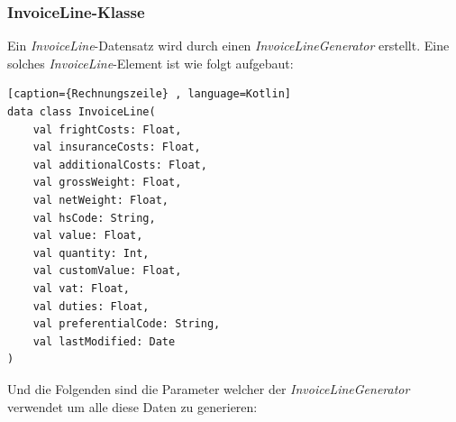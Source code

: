 \subsubsection{InvoiceLine-Klasse}
Ein \textit{InvoiceLine}-Datensatz wird durch einen \textit{InvoiceLineGenerator} erstellt. Eine solches \textit{InvoiceLine}-Element ist wie folgt aufgebaut:
\begin{lstlisting}[caption={Rechnungszeile} , language=Kotlin]
data class InvoiceLine(
    val frightCosts: Float,
    val insuranceCosts: Float,
    val additionalCosts: Float,
    val grossWeight: Float,
    val netWeight: Float,
    val hsCode: String,
    val value: Float,
    val quantity: Int,
    val customValue: Float,
    val vat: Float,
    val duties: Float,
    val preferentialCode: String,
    val lastModified: Date
)
\end{lstlisting}
\vspace{4mm}\par
\newpage
Und die Folgenden sind die Parameter welcher der \textit{InvoiceLineGenerator} verwendet um alle diese Daten zu generieren: 

